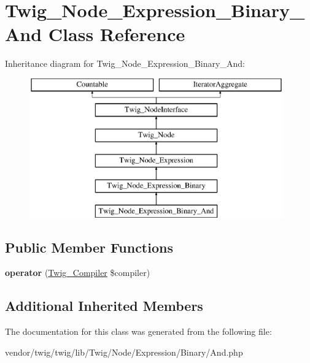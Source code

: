 \hypertarget{classTwig__Node__Expression__Binary__And}{}\section{Twig\+\_\+\+Node\+\_\+\+Expression\+\_\+\+Binary\+\_\+\+And Class Reference}
\label{classTwig__Node__Expression__Binary__And}
Inheritance diagram for Twig\+\_\+\+Node\+\_\+\+Expression\+\_\+\+Binary\+\_\+\+And\+:\begin{figure}[H]
\begin{center}
\leavevmode
\includegraphics[height=6.000000cm]{classTwig__Node__Expression__Binary__And}
\end{center}
\end{figure}
\subsection*{Public Member Functions}
\begin{DoxyCompactItemize}
\item 
{\bfseries operator} (\hyperlink{classTwig__Compiler}{Twig\+\_\+\+Compiler} \$compiler)\hypertarget{classTwig__Node__Expression__Binary__And_a1632c8c4281a261a5567ee80dc320ba4}{}\label{classTwig__Node__Expression__Binary__And_a1632c8c4281a261a5567ee80dc320ba4}

\end{DoxyCompactItemize}
\subsection*{Additional Inherited Members}


The documentation for this class was generated from the following file\+:\begin{DoxyCompactItemize}
\item 
vendor/twig/twig/lib/\+Twig/\+Node/\+Expression/\+Binary/And.\+php\end{DoxyCompactItemize}
